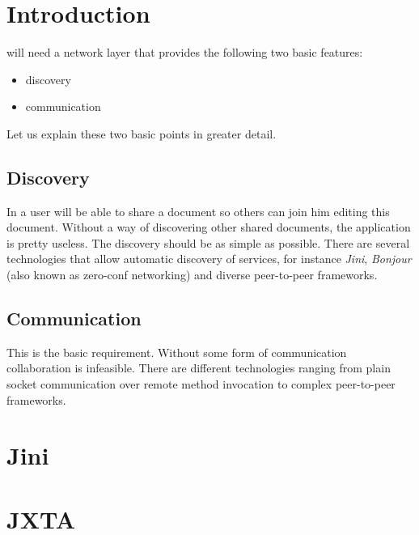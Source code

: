 \documentclass[11pt,a4paper]{article}
\begin{document}
\setlength{\parindent}{0pt}


\newpage

\tableofcontents
\newpage

\listoftables
\listoffigures
\newpage


\section{Introduction}
\ace will need a network layer that provides the following two basic features:

\begin{itemize}
 \item discovery
 \item communication
\end{itemize}

Let us explain these two basic points in greater detail.

\subsection{Discovery}
In \ace a user will be able to share a document so others can join him editing this document. Without a way of discovering other shared documents, the application is pretty useless. The discovery should be as simple as possible. There are several technologies that allow automatic discovery of services, for instance \emph{Jini}, \emph{Bonjour} (also known as zero-conf networking) and diverse peer-to-peer frameworks.

\subsection{Communication}
This is the basic requirement. Without some form of communication collaboration is infeasible. There are different technologies ranging from plain socket communication over remote method invocation to complex peer-to-peer frameworks.







\section{Jini}

\section{JXTA}


\end{document}
